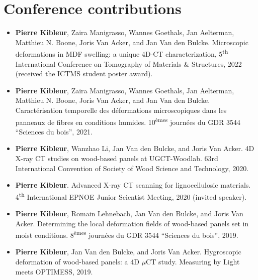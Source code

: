 \documentclass[oneside, english, 10pt, a4paper]{memoir}
\begin{document}
    \section{Conference contributions}
    \begin{itemize}
    	\item  {\textbf{Pierre Kibleur}, Zaira Manigrasso, Wannes Goethals, Jan Aelterman, Matthieu N. Boone, Joris Van Acker, and Jan Van den Bulcke}. {Microscopic deformations in MDF swelling: a unique 4D-CT characterization}, 5\textsuperscript{th} International Conference on Tomography of Materials \& Structures, 2022 (received the ICTMS student poster award). 
    	
    	\item {\textbf{Pierre Kibleur}, Zaira Manigrasso, Wannes Goethals, Jan Aelterman, Matthieu N. Boone, Joris Van Acker, and Jan Van den Bulcke}. Caract\'erisation temporelle des d\'eformations microscopiques dans les panneaux de fibres en conditions humides. 10\textsuperscript{\`emes} journ\'ees du GDR 3544 ``Sciences du bois'', 2021.
    	
    	\item \textbf{Pierre Kibleur}, Wanzhao Li, Jan Van den Bulcke, and Joris Van Acker. 4D X-ray CT studies on wood-based panels at UGCT-Woodlab. 63rd International Convention of Society of Wood Science and Technology, 2020.
    	
    	\item \textbf{Pierre Kibleur}. Advanced X-ray CT scanning for lignocellulosic materials. 4\textsuperscript{th} International EPNOE Junior Scientist Meeting, 2020 (invited speaker).
    	
    	\item  \textbf{Pierre Kibleur}, Romain Lehnebach, Jan Van den Bulcke, and Joris Van Acker. Determining the local deformation fields of wood-based panels set in moist conditions. 8\textsuperscript{\`emes} journ\'ees du GDR 3544 ``Sciences du bois'', 2019.
    	
    	\item  \textbf{Pierre Kibleur}, Jan Van den Bulcke, and Joris Van Acker. Hygroscopic deformation of wood-based panels: a 4D $\mu$CT study. Measuring by Light meets OPTIMESS, 2019.
    \end{itemize}    
\end{document}

